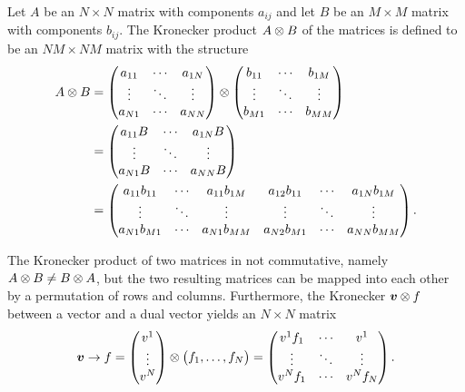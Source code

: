 \begin{defn}
    Let $A$ be an $N \times N$ matrix with components $a_{ij}$ and let $B$ be an $M \times M$ matrix with components $b_{ij}$. The Kronecker product $A \otimes B$ of the matrices is defined to be an $NM \times NM$ matrix with the structure
    \begin{equation}
        \begin{split}
            A \otimes B &= 
            \begin{pmatrix}
                a_{11} & \cdots & a_{1N} \\
                \vdots & \ddots & \vdots \\
                a_{N1} & \cdots & a_{NN}
            \end{pmatrix} \otimes
            \begin{pmatrix}
                b_{11} & \cdots & b_{1M} \\
                \vdots & \ddots & \vdots \\
                b_{M1} & \cdots & b_{MM}
            \end{pmatrix} \\
            &= 
            \begin{pmatrix}
                a_{11}B & \cdots & a_{1N}B \\
                \vdots & \ddots & \vdots \\
                a_{N1}B & \cdots & a_{NN}B
            \end{pmatrix} \\
            &= 
            \begin{pmatrix}
                a_{11}b_{11} & \cdots & a_{11}b_{1M} & a_{12}b_{11} & \cdots & a_{1N}b_{1M} \\
                \vdots & \ddots & \vdots & \vdots & \ddots & \vdots \\
                a_{N1}b_{M1} & \cdots & a_{N1}b_{MM} & a_{N2}b_{M1} & \cdots & a_{NN}b_{MM}
            \end{pmatrix}.
        \end{split}
    \end{equation}
\end{defn}
The Kronecker product of two matrices in not commutative, namely $A \otimes B \neq B \otimes A$, but the two resulting matrices can be mapped into each other by a permutation of rows and columns. Furthermore, the Kronecker $\bm{v} \otimes f$ between a vector and a dual vector yields an $N \times N$ matrix
\begin{equation}
    \bm{v} \to f =
    \begin{pmatrix}
        v^1 \\
        \vdots \\
        v^N
    \end{pmatrix} \otimes
    \begin{pmatrix}
        f_1,\dots,f_N
    \end{pmatrix} = 
    \begin{pmatrix}
        v^1f_1 & \cdots & v^1 \\
        \vdots & \ddots & \vdots \\
        v^Nf_1 & \cdots & v^Nf_N
    \end{pmatrix}.
\end{equation}
